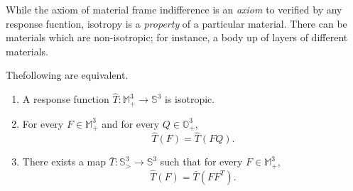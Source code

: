 While the axiom of material frame indifference is an \textit{axiom} to
verified by any response fucntion, isotropy is a \textit{property} of
a particular material. There can be materials which are non-isotropic;
for instance, a body up of layers of different materials.

\begin{theorem}\label{chap1-thm1.3.3} %
	The\pageoriginale following are equivalent. 
\begin{enumerate}[\rm(i)]
\item A response function $\hat{T}: \mathbb{M}^3_+ \to \mathbb{S}^3$
  is isotropic.  
\item For every $F \in \mathbb{M}^3_+$ and for every $Q \in \mathbb{O}^3_+$, 
\begin{equation*}
\hat{T}(F)= \hat{T}(FQ). \tag{1.3-8}\label{eq1.3-8}
\end{equation*}
\item There exists a map $\bar{T}: \mathbb{S}^3_> \to \mathbb{S}^3$
  such that for every $F \in \mathbb{M}^3_+$, 
 \begin{equation*}
\hat{T}(F)= \bar{T}(FF^T). \tag{1.3-9}\label{eq1.3-9}
 \end{equation*}
\end{enumerate}
\end{theorem}

